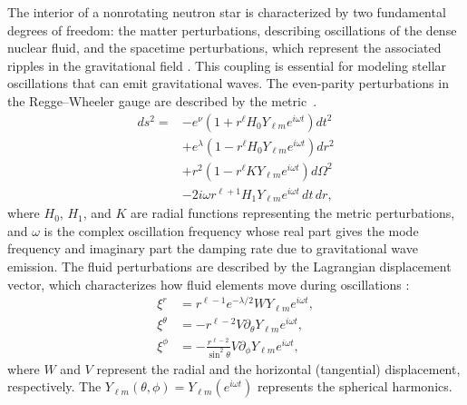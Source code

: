 The interior of a nonrotating neutron star is characterized by two fundamental degrees of freedom: the matter perturbations, describing oscillations of the dense nuclear fluid, and the spacetime perturbations, which represent the associated ripples in the gravitational field \cite{Throne_1967,Lindblom_1983}. This coupling is essential for modeling stellar oscillations that can emit gravitational waves. The even-parity perturbations in the Regge--Wheeler gauge are described by the metric~\cite{Lindblom_1983}.
\begin{equation}
	\begin{aligned}
		ds^{2} = & -e^{\nu}\left(1 + r^{\ell} H_{0} Y_{\ell m} e^{i\omega t}\right) dt^{2} \\
		& + e^{\lambda}\left(1 - r^{\ell} H_{0} Y_{\ell m} e^{i\omega t}\right) dr^{2} \\
		& + r^{2}\left(1 - r^{\ell} K Y_{\ell m} e^{i\omega t}\right) d\Omega^{2} \\
		& - 2i \omega r^{\ell+1} H_{1} Y_{\ell m} e^{i\omega t} \, dt \, dr,
	\end{aligned}
\end{equation}
where \(H_0\), \(H_1\), and \(K\) are radial functions representing the metric perturbations, and \(\omega\) is the complex oscillation frequency whose real part gives the mode frequency and imaginary part the damping rate due to gravitational wave emission. The fluid perturbations are described by the Lagrangian displacement vector, which characterizes how fluid elements move during oscillations \cite{Throne_1967,Lindblom_1983}:
\begin{equation}
	\begin{aligned}
		\xi^r      &= r^{\ell-1} e^{-\lambda/2} W Y_{\ell m} e^{i\omega t}, \\
		\xi^\theta &= -r^{\ell-2} V \partial_\theta Y_{\ell m} e^{i\omega t}, \\
		\xi^\phi   &= -\frac{r^{\ell-2}}{\sin^2\theta} V \partial_\phi Y_{\ell m} e^{i\omega t},
	\end{aligned}
\end{equation}
\noindent
where \(W\) and \(V\) represent the radial and the horizontal (tangential) displacement, respectively. The $Y_{\ell m}(\theta, \phi)=Y_{\ell m}(e^{i\omega t})$ represents the spherical harmonics. 
